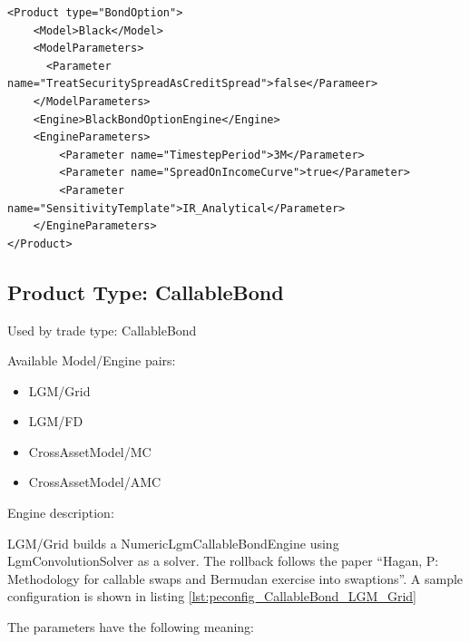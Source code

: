 \begin{longlisting}
\begin{verbatim}
<Product type="BondOption">
    <Model>Black</Model>
    <ModelParameters>
      <Parameter name="TreatSecuritySpreadAsCreditSpread">false</Parameer>
    </ModelParameters>
    <Engine>BlackBondOptionEngine</Engine>
    <EngineParameters>
        <Parameter name="TimestepPeriod">3M</Parameter>
        <Parameter name="SpreadOnIncomeCurve">true</Parameter>
        <Parameter name="SensitivityTemplate">IR_Analytical</Parameter>
    </EngineParameters>
</Product>
\end{verbatim}
\caption{Configuration for Product BondOption, Model Black, Engine BlackBondOptionEngine}
\label{lst:peconfig_BondOption_Black_BlackBondOptionEngine}
\end{longlisting}

\subsection{Product Type: CallableBond}

Used by trade type: CallableBond

Available Model/Engine pairs:

\begin{itemize}
\item LGM/Grid
\item LGM/FD
\item CrossAssetModel/MC
\item CrossAssetModel/AMC
\end{itemize}

Engine description:

LGM/Grid builds a NumericLgmCallableBondEngine using LgmConvolutionSolver as a solver. The rollback follows the paper
``Hagan, P: Methodology for callable swaps and Bermudan exercise into swaptions''. A sample configuration is shown in
listing \ref{lst:peconfig_CallableBond_LGM_Grid}

The parameters have the following meaning:

